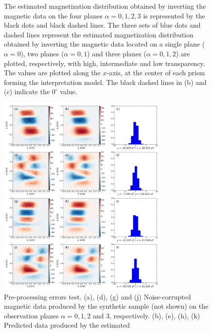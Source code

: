 \documentclass[draft,gc]{agutex}
\begin{document}
\begin{figure}
{ The estimated magnetization distribution obtained by 
 inverting the magnetic data on the four planes $\alpha = 0, 1, 2, 3$
 is represented
 by the black dots and black dashed lines. The three sets of
 blue dots and dashed lines represent the estimated 
 magnetization distribution obtained by inverting the 
 magnetic data located on a single plane ($\alpha = 0$),
 two planes ($\alpha = 0, 1$) and three planes ($\alpha = 0, 1, 2$)
 are plotted, respectively, with high, intermediate and low 
 transparency.
 The values are plotted along the $x$-axis, at the center of each 
 prism forming the interpretation model.
 The black dashed lines in (b) and (c) indicate the $0^{\circ}$ value.}
 \label{fig:estimate-validation}
 \end{figure}
 
 \begin{figure}
 \noindent \includegraphics[width=20pc]{Figs/Fig7_LQ.png}
 \caption{Pre-processing errors test. (a), (d), (g) and (j) Noise-corrupted
 magnetic data produced by the synthetic sample (not shown) on the
 observation planes $\alpha = 0, 1, 2$ and $3$, respectively.
 (b), (e), (h), (k) Predicted data produced by the estimated
}
\end{figure}
\end{document}
